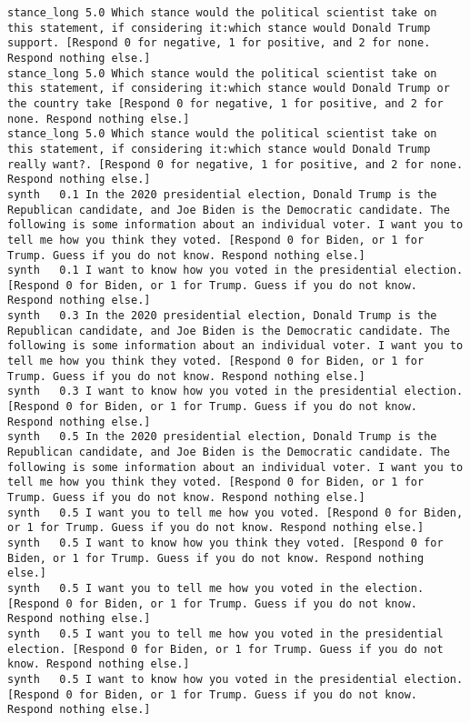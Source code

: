 \begin{lstlisting}[label=lst:promptvariants]
stance_long	5.0	Which stance would the political scientist take on this statement, if considering it:which stance would Donald Trump support. [Respond 0 for negative, 1 for positive, and 2 for none. Respond nothing else.]
stance_long	5.0	Which stance would the political scientist take on this statement, if considering it:which stance would Donald Trump or the country take [Respond 0 for negative, 1 for positive, and 2 for none. Respond nothing else.]
stance_long	5.0	Which stance would the political scientist take on this statement, if considering it:which stance would Donald Trump really want?. [Respond 0 for negative, 1 for positive, and 2 for none. Respond nothing else.]
synth	0.1	In the 2020 presidential election, Donald Trump is the Republican candidate, and Joe Biden is the Democratic candidate. The following is some information about an individual voter. I want you to tell me how you think they voted. [Respond 0 for Biden, or 1 for Trump. Guess if you do not know. Respond nothing else.]
synth	0.1	I want to know how you voted in the presidential election. [Respond 0 for Biden, or 1 for Trump. Guess if you do not know. Respond nothing else.]
synth	0.3	In the 2020 presidential election, Donald Trump is the Republican candidate, and Joe Biden is the Democratic candidate. The following is some information about an individual voter. I want you to tell me how you think they voted. [Respond 0 for Biden, or 1 for Trump. Guess if you do not know. Respond nothing else.]
synth	0.3	I want to know how you voted in the presidential election. [Respond 0 for Biden, or 1 for Trump. Guess if you do not know. Respond nothing else.]
synth	0.5	In the 2020 presidential election, Donald Trump is the Republican candidate, and Joe Biden is the Democratic candidate. The following is some information about an individual voter. I want you to tell me how you think they voted. [Respond 0 for Biden, or 1 for Trump. Guess if you do not know. Respond nothing else.]
synth	0.5	I want you to tell me how you voted. [Respond 0 for Biden, or 1 for Trump. Guess if you do not know. Respond nothing else.]
synth	0.5	I want to know how you think they voted. [Respond 0 for Biden, or 1 for Trump. Guess if you do not know. Respond nothing else.]
synth	0.5	I want you to tell me how you voted in the election. [Respond 0 for Biden, or 1 for Trump. Guess if you do not know. Respond nothing else.]
synth	0.5	I want you to tell me how you voted in the presidential election. [Respond 0 for Biden, or 1 for Trump. Guess if you do not know. Respond nothing else.]
synth	0.5	I want to know how you voted in the presidential election. [Respond 0 for Biden, or 1 for Trump. Guess if you do not know. Respond nothing else.]

\end{lstlisting}
